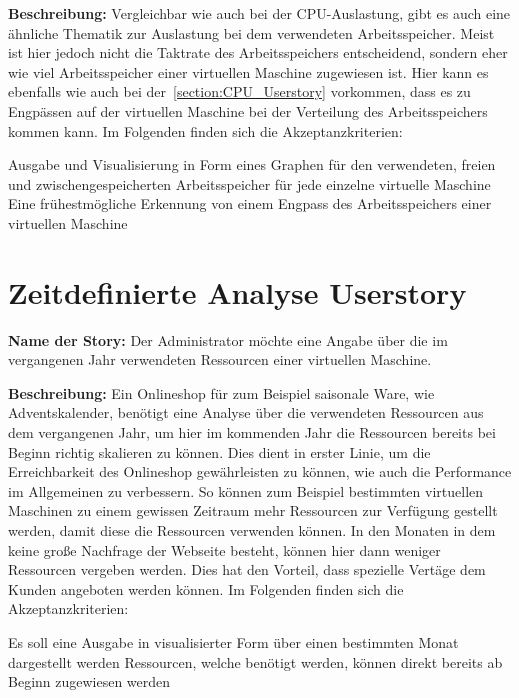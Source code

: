 \textbf{Beschreibung:} Vergleichbar wie auch bei der CPU-Auslastung, gibt es
auch eine ähnliche Thematik zur Auslastung bei dem verwendeten Arbeitsspeicher.
Meist ist hier jedoch nicht die Taktrate des Arbeitsspeichers entscheidend,
sondern eher wie viel Arbeitsspeicher einer virtuellen Maschine zugewiesen ist.
Hier kann es ebenfalls wie auch bei der~\ref{section:CPU_Userstory}
vorkommen, dass es zu Engpässen auf der virtuellen Maschine bei der Verteilung
des Arbeitsspeichers kommen kann. Im Folgenden finden sich die
Akzeptanzkriterien:

\begin{outline}
  \1 Ausgabe und Visualisierung in Form eines Graphen für den verwendeten,
  freien und zwischengespeicherten Arbeitsspeicher für jede einzelne virtuelle
  Maschine
  \1 Eine frühestmögliche Erkennung von einem Engpass des Arbeitsspeichers
  einer virtuellen Maschine
\end{outline}
\mr%

\section{Zeitdefinierte Analyse Userstory}
\textbf{Name der Story:} Der Administrator möchte eine Angabe über die im
vergangenen Jahr verwendeten Ressourcen einer virtuellen Maschine.

\textbf{Beschreibung:} Ein Onlineshop für zum Beispiel saisonale Ware, wie
Adventskalender, benötigt eine Analyse über die verwendeten Ressourcen aus dem
vergangenen Jahr, um hier im kommenden Jahr die Ressourcen bereits bei Beginn
richtig skalieren zu können. Dies dient in erster Linie, um die Erreichbarkeit
des Onlineshop gewährleisten zu können, wie auch die Performance im Allgemeinen
zu verbessern. So können zum Beispiel bestimmten virtuellen Maschinen zu einem
gewissen Zeitraum mehr Ressourcen zur Verfügung gestellt werden, damit diese
die Ressourcen verwenden können. In den Monaten in dem keine große Nachfrage
der Webseite besteht, können hier dann weniger Ressourcen vergeben werden. Dies
hat den Vorteil, dass spezielle Vertäge dem Kunden angeboten werden können. Im
Folgenden finden sich die Akzeptanzkriterien:

\begin{outline}
  \1 Es soll eine Ausgabe in visualisierter Form über einen bestimmten Monat
  dargestellt werden
  \1 Ressourcen, welche benötigt werden, können direkt bereits ab Beginn
  zugewiesen werden
\end{outline}
\mr%

